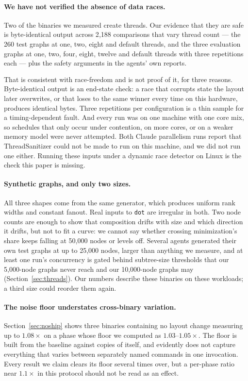 \paragraph{We have not verified the absence of data races.}
Two of the binaries we measured create threads. Our evidence that they are safe
is byte-identical output across 2{,}188 comparisons that vary thread count ---
the 260 test graphs at one, two, eight and default threads, and the three
evaluation graphs at one, two, four, eight, twelve and default threads with
three repetitions each --- plus the safety arguments in the agents' own reports.

That is consistent with race-freedom and is not proof of it, for three reasons.
Byte-identical output is an end-state check: a race that corrupts state the
layout later overwrites, or that loses to the same winner every time on this
hardware, produces identical bytes. Three repetitions per configuration is a
thin sample for a timing-dependent fault. And every run was on one machine with
one core mix, so schedules that only occur under contention, on more cores, or
on a weaker memory model were never attempted. Both Claude parallelism runs
report that ThreadSanitizer could not be made to run on this machine, and we did
not run one either. Running these inputs under a dynamic race detector on Linux
is the check this paper is missing.

\paragraph{Synthetic graphs, and only two sizes.}
All three shapes come from the same generator, which produces uniform rank
widths and constant fanout. Real inputs to \texttt{dot} are irregular in both.
Two node counts are enough to show that composition drifts with size and which
direction it drifts, but not to fit a curve: we cannot say whether crossing
minimization's share keeps falling at 50{,}000 nodes or levels off. Several
agents generated their own test graphs at up to 25{,}000 nodes, larger than
anything we measure, and at least one run's concurrency is gated behind
subtree-size thresholds that our 5{,}000-node graphs never reach and our
10{,}000-node graphs may (Section~\ref{sec:threads}). Our numbers describe these
binaries on these workloads; a third size could reorder them again.

\paragraph{The noise floor understates cross-binary variation.}
Section~\ref{sec:noship} shows three binaries containing no layout change
measuring up to $1.08\times$ on a phase whose floor we computed as
$1.03$--$1.05\times$. The floor is built from the baseline against copies of
itself, and evidently does not capture everything that varies between separately
named commands in one invocation. Every result we claim clears its floor several
times over, but a per-phase ratio near $1.1\times$ in this protocol should not be
read as an effect.

